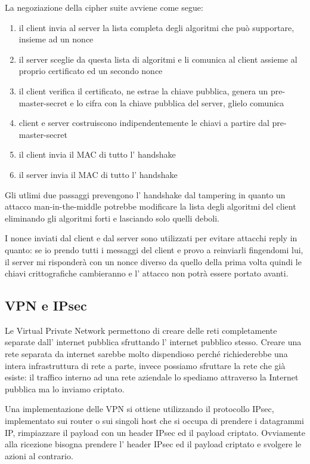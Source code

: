La negoziazione della cipher suite avviene come segue:
\begin{enumerate}
    \item il client invia al server la lista completa degli algoritmi che può supportare, insieme ad un nonce

    \item il server sceglie da questa lista di algoritmi e li comunica al client assieme al proprio certificato ed un secondo nonce
    
    \item il client verifica il certificato, ne estrae la chiave pubblica, genera un pre-master-secret e lo cifra con la chiave pubblica del server, glielo comunica
    
    \item client e server costruiscono indipendentemente le chiavi a partire dal pre-master-secret
    
    \item il client invia il MAC di tutto l' handshake
    
    \item il server invia il MAC di tutto l' handshake
\end{enumerate}
Gli utlimi due passaggi prevengono l' handshake dal tampering in quanto un attacco man-in-the-middle potrebbe modificare la lista degli algoritmi del client eliminando gli algoritmi forti e lasciando solo quelli deboli.

I nonce inviati dal client e dal server sono utilizzati per evitare attacchi reply in quanto: se io prendo tutti i messaggi del client e provo a reinviarli fingendomi lui, il server mi risponderà con un nonce diverso da quello della prima volta quindi le chiavi crittografiche cambieranno e l' attacco non potrà essere portato avanti.

\subsection{VPN e IPsec}
Le Virtual Private Network permettono di creare delle reti completamente separate dall' internet pubblica sfruttando l' internet pubblico stesso.
Creare una rete separata da internet sarebbe molto dispendioso perché richiederebbe una intera infrastruttura di rete a parte, invece possiamo sfruttare la rete che già esiste: il traffico interno ad una rete aziendale lo spediamo attraverso la Internet pubblica ma lo inviamo criptato.

Una implementazione delle VPN si ottiene utilizzando il protocollo IPsec, implementato sui router o sui singoli host che si occupa di prendere i datagrammi IP, rimpiazzare il payload con un header IPsec ed il payload criptato.
Ovviamente alla ricezione bisogna prendere l' header IPsec ed il payload criptato e svolgere le azioni al contrario.

